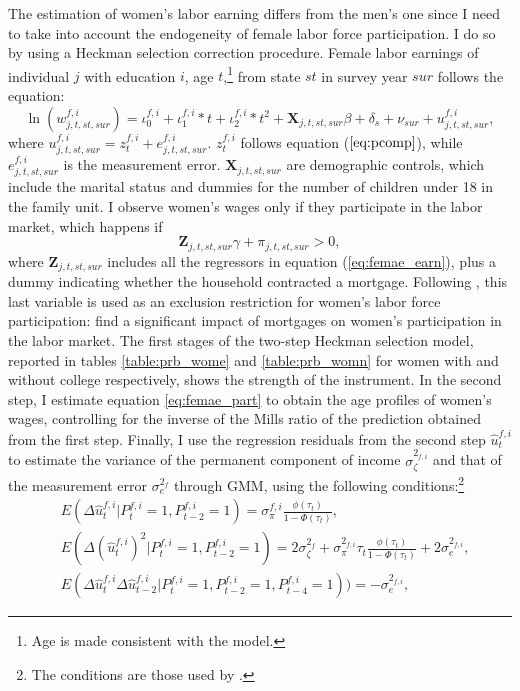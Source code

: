 \documentclass[12pt]{article}
\begin{document}
The estimation of women's labor earning differs from the men's one since I need to take into account the endogeneity of female labor force participation. I do so by using a Heckman selection correction procedure. Female labor earnings of individual $j$ with education $i$, age $t$,\footnote{Age is made consistent with the model.} from state $st$  in survey year $sur$ follows the equation:
\begin{equation}\label{eq:femae_earn}
\ln(w^{f,i}_{j,t,st,sur})=\iota^{f,i}_0+\iota^{f,i}_1*t+\iota^{f,i}_2*t^2+\mathbf{X}_{j,t,st,sur}\beta+\delta_s+\nu_{sur}+u_{j,t,st,sur}^{f,i},
\end{equation}
where $u_{j,t,st,sur}^{f,i}=z_t^{f,i}+e^{f,i}_{j,t,st,sur}$. $z_t^{f,i}$ follows equation ($\ref{eq:pcomp}$), while $e^{f,i}_{j,t,st,sur}$ is the measurement error.  $\mathbf{X}_{j,t,st,sur}$ are demographic controls, which include the marital status and dummies for the number of children under 18 in the family unit. I observe women's wages only if they participate in the labor market, which happens if
\begin{equation}\label{eq:femae_part}
\mathbf{Z}_{j,t,st,sur}\gamma+\pi_{j,t,st,sur}>0,
\end{equation}
where $\mathbf{Z}_{j,t,st,sur}$ includes all the regressors in equation (\ref{eq:femae_earn}), plus a dummy indicating whether the household contracted a mortgage. Following \cite{blundell2016}, this last variable is used as an exclusion restriction for women's labor force participation: \cite{del2003} find a significant impact of mortgages on women's participation in the labor market. 
The first stages of the two-step Heckman selection model, reported in tables \ref{table:prb_wome} and \ref{table:prb_womn} for women with and without college respectively, shows the strength of the instrument. In the second step, I estimate equation \ref{eq:femae_part} to obtain the age profiles of women's wages, controlling for the inverse of the Mills ratio of the prediction obtained from the first step.
Finally, I use the regression residuals from the second step $\hat{u}_{t}^{f,i}$  to estimate the variance of the permanent component of income $\sigma_\zeta^{2_{f,i}}$ and that of the measurement error $\sigma_e^{2_f}$ through GMM, using the following conditions:\footnote{The conditions are those used by \cite{low2018}.}
\begin{equation}\label{eq:female_gmm}
\begin{split}
&E(\Delta\hat{u}_{t}^{f,i} | P^{f,i}_t=1,P^{f,i}_{t-2}=1)=\sigma_\pi^{f,i}\frac{\phi(\tau_t)}{1-\Phi(\tau_t)},\\
&E(\Delta(\hat{u}_{t}^{f,i})^2 | P^{f,i}_t=1,P^{f,i}_{t-2}=1)=2 \sigma_\zeta^{2_f}+\sigma_\pi^{2_{f,i}}\tau_t\frac{\phi(\tau_t)}{1-\Phi(\tau_t)}+2\sigma_e^{2_{f,i}},\\
&E(\Delta\hat{u}_{t}^{f,i}\Delta\hat{u}_{t-2}^{f,i} | P^{f,i}_t=1,P^{f,i}_{t-2}=1,P^{f,i}_{t-4}=1))=-\sigma_e^{2_{f,i}},
\end{split}
\end{equation}
\end{document}
